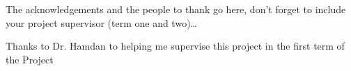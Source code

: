 The acknowledgements and the people to thank go here, don't forget to include your project supervisor (term one and two)\ldots

Thanks to Dr. Hamdan to helping me supervise this project in the first term of the Project